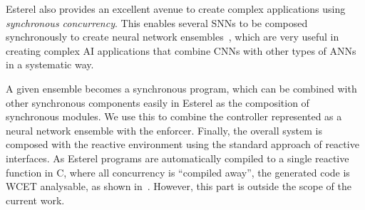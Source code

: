 Esterel also provides an excellent avenue to create complex
applications using  \emph{synchronous concurrency}. This enables
several \acp{SNN} to be composed synchronously to
create neural network ensembles~\cite{Maqsood2004}, which are very useful in
creating complex AI applications that combine \acp{CNN} with other
types of \acp{ANN} in a systematic way. 

A given ensemble becomes a synchronous program, which can be combined
with other synchronous components easily in Esterel as the composition
of synchronous modules. We use this to combine the controller
represented as a neural network ensemble with the enforcer. Finally,
the overall system is composed with the reactive environment using the
standard approach of reactive interfaces. As Esterel programs are
automatically compiled to a single reactive function in C, where all
concurrency is ``compiled away'', the generated code is WCET
analysable, as shown in~\cite{sann}. However, this part is outside the
scope of the current work.